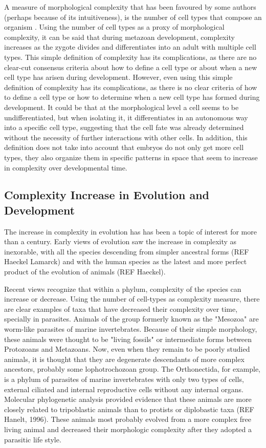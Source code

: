 A measure of morphological complexity that has been favoured by some authors (perhaps because of its intuitiveness), is the number of cell types that compose an organism 
	\citep{Bell1997,Bonner2004,McShea1996}.
Using the number of cell types as a proxy of morphological complexity, it can be said that during metazoan development, complexity increases as the zygote divides and differentiates into an adult with multiple cell types. This simple definition of complexity has its complications, as there are no clear-cut consensus criteria about how to define a cell type or about when a new cell type has arisen during development. 
However, even using this simple definition of complexity has its complications, as there is no clear criteria of how to define a cell type or how to determine when a new cell type has formed during development. It could be that at the morphological level a cell seems to be undifferentiated, but when isolating it, it differentiates in an autonomous way into a specific cell type, suggesting that the cell fate was already determined without the necessity of further interactions with other cells. 
In addition, this definition does not take into account that embryos do not only get more cell types, they also organize them in specific patterns in space that seem to increase in complexity over developmental time.

\subsection{Complexity Increase in Evolution and Development}

The increase in complexity in evolution has has been a topic of interest for more than a century.
Early views of evolution saw the increase in complexity as inexorable, with all the species descending from simpler ancestral forms (REF Haeckel Lamarck) and with the human species as the latest and more perfect product of the evolution of animals (REF Haeckel).


Recent views recognize that within a phylum, complexity of the species can increase or decrease.
Using the number of cell-types as complexity measure, there are clear examples of taxa that have decreased their complexity over time, specially in parasites.
Animals of the group formerly known as the "Mesozoa" are worm-like parasites of marine invertebrates.
Because of their simple morphology, these animals were thought to be "living fossils" or intermediate forms between Protozoans and Metazoans.
Now, even when they remain to be poorly studied animals, it is thought that they are  degenerate descendants of more complex ancestors, probably some lophotrochozoan group\citep{Arthur2010}.
The Orthonectida, for example, is a phylum of parasites of marine invertebrates with only two types of cells, external ciliated and internal reproductive cells without any internal organs. 
Molecular phylogenetic analysis provided evidence that these animals are more closely related to tripoblastic animals than to protists or diplobastic taxa (REF Hanelt, 1996).
These animals most probably evolved from a more complex free living animal and decreased their morphologic complexity after they adopted a parasitic life style.

